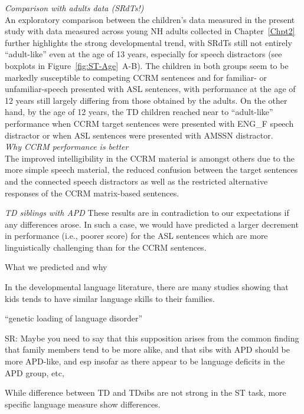 \documentclass[a4paper, twoside]{templates/ociamthesis}
\begin{document}
\colorbox[HTML]{CCCCFF}{\emph{Comparison with adults data (SRdTs!)}}\\
An exploratory comparison between the children's data measured in the present study with data measured across young NH adults collected in Chapter~\ref{Chpt2} further highlights the strong developmental trend, with SRdTs still not entirely ``adult-like'' even at the age of 13 years, especially for speech distractors (see boxplots in Figure~\ref{fig:ST-Age}~A-B). The children in both groups seem to be markedly susceptible to competing CCRM sentences and for familiar- or unfamiliar-speech presented with ASL sentences, with performance at the age of 12 years still largely differing from those obtained by the adults. On the other hand, by the age of 12 years, the TD children reached near to ``adult-like'' performance when CCRM target sentences were presented with ENG\_F speech distractor or when ASL sentences were presented with AMSSN distractor.\\

\colorbox[HTML]{CCCCFF}{\emph{Why CCRM performance is better}}\\
The improved intelligibility in the CCRM material is amongst others due to the more simple speech material, the reduced confusion between the target sentences and the connected speech distractors as well as the restricted alternative responses of the CCRM matrix-based sentences.

\colorbox[HTML]{CCCCFF}{\emph{TD siblings with APD}}
These results are in contradiction to our expectations if any differences arose. In such a case, we would have predicted a larger decrement in performance (i.e., poorer score) for the ASL sentences which are more linguistically challenging than for the CCRM sentences.

What we predicted and why

In the developmental language literature, there are many studies showing that kids tends to have similar language skills to their families.

``genetic loading of language disorder''

SR:
Maybe you need to say that this supposition arises from the common finding that family members tend to be more alike, and that sibs with APD should be more APD-like, and esp insofar as there appear to be language deficits in the APD group, etc,

While difference between TD and TDsibs are not strong in the ST task, more specific language measure show differences.
\end{document}
